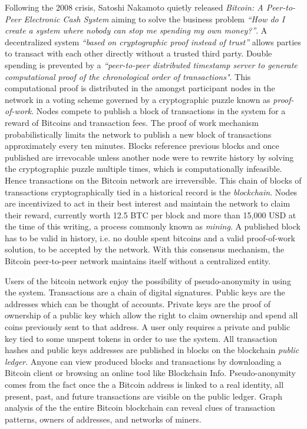 \documentclass[a4paper,12pt]{article} %
\begin{document}
Following the 2008 crisis, Satoshi Nakamoto quietly released \textit{Bitcoin: A Peer-to-Peer Electronic Cash System}\cite{nakamoto2008bitcoin} aiming to solve the business problem \textit{``How do I create a system where nobody can stop me spending my own money?''}\cite{brown2016introducing}. A decentralized system \textit{``based on cryptographic proof instead of trust''} allows parties to transact with each other directly without a trusted third party. Double spending is prevented by a \textit{``peer-to-peer distributed timestamp server to generate computational proof of the chronological order of transactions"}\cite{nakamoto2008bitcoin}. This computational proof is distributed in the amongst participant nodes in the network in a voting scheme governed by a cryptographic puzzle known as \textit{proof-of-work}. Nodes compete to publish a block of transactions in the system for a reward of Bitcoins and transaction fees. The proof of work mechanism probabilistically limits the network to publish a new block of transactions approximately every ten minutes. Blocks reference previous blocks and once published are irrevocable unless another node were to rewrite history by solving the cryptographic puzzle multiple times, which is computationally infeasible. Hence transactions on the Bitcoin network are irreversible. This chain of blocks of transactions cryptographically tied in a historical record is the \textit{blockchain}. Nodes are incentivized to act in their best interest and maintain the network to claim their reward, currently worth 12.5 BTC per block and more than 15,000 USD at the time of this writing, a process commonly known as \textit{mining}. A published block has to be valid in history, i.e. no double spent bitcoins and a valid proof-of-work solution, to be accepted by the network. With this consensus mechanism, the Bitcoin peer-to-peer network maintains itself without a centralized entity\cite{nakamoto2008bitcoin}.

Users of the bitcoin network enjoy the possibility of pseudo-anonymity in using the system. Transactions are a chain of digital signatures. Public keys are the addresses which can be thought of accounts. Private keys are the proof of ownership of a public key which allow the right to claim ownership and spend all coins previously sent to that address. A user only requires a private and public key tied to some unspent tokens in order to use the system\cite{nakamoto2008bitcoin}. All transaction hashes and public keys addresses are published in blocks on the blockchain \textit{public ledger}. Anyone can view produced blocks and transactions by downloading a Bitcoin client or browsing an online tool like Blockchain Info\cite{blockchaininfo}.  Pseudo-anonymity comes from the fact once the a Bitcoin address is linked to a real identity, all present, past, and future transactions are visible on the public ledger. Graph analysis of the the entire Bitcoin blockchain can reveal clues of transaction patterns, owners of addresses, and networks of miners\cite{Ron2013}.
\end{document}
